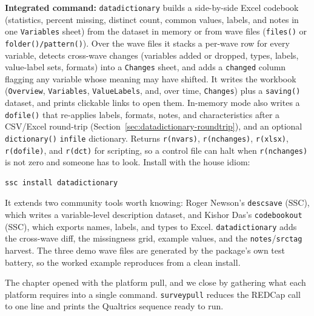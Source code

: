 \begin{kaobox}[frametitle=Package Integration: \texttt{datadictionary}]
\textbf{Integrated command:} \texttt{datadictionary} builds a side-by-side Excel codebook (statistics, percent missing, distinct count, common values, labels, and notes in one \texttt{Variables} sheet) from the dataset in memory or from wave files (\texttt{files()} or \texttt{folder()/pattern()}). Over the wave files it stacks a per-wave row for every variable, detects cross-wave changes (variables added or dropped, types, labels, value-label sets, formats) into a \texttt{Changes} sheet, and adds a \texttt{changed} column flagging any variable whose meaning may have shifted. It writes the workbook (\texttt{Overview}, \texttt{Variables}, \texttt{ValueLabels}, and, over time, \texttt{Changes}) plus a \texttt{saving()} dataset, and prints clickable links to open them. In-memory mode also writes a \texttt{dofile()} that re-applies labels, formats, notes, and characteristics after a CSV/Excel round-trip (Section~\ref{sec:datadictionary-roundtrip}), and an optional \texttt{dictionary()} \texttt{infile} dictionary. Returns \texttt{r(nvars)}, \texttt{r(nchanges)}, \texttt{r(xlsx)}, \texttt{r(dofile)}, and \texttt{r(dct)} for scripting, so a control file can halt when \texttt{r(nchanges)} is not zero and someone has to look. Install with the house idiom:
\par
{\footnotesize
\begin{verbatim}
ssc install datadictionary
\end{verbatim}
}
It extends two community tools worth knowing: Roger Newson's \texttt{descsave} (SSC), which writes a variable-level description dataset, and Kishor Das's \texttt{codebookout} (SSC), which exports names, labels, and types to Excel. \texttt{datadictionary} adds the cross-wave diff, the missingness grid, example values, and the \texttt{notes}/\texttt{srctag} harvest. The three demo wave files are generated by the package's own test battery, so the worked example reproduces from a clean install.
\end{kaobox}

The chapter opened with the platform pull, and we close by gathering what each platform requires into a single command. \texttt{surveypull} reduces the REDCap call to one line and prints the Qualtrics sequence ready to run.


